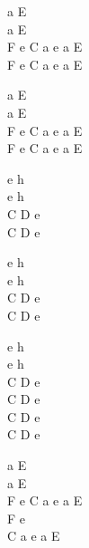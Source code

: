 \begin{chord}
    a E\\
    a E\\
    F e C a e a E\\
    F e C a e a E

    a E\\
    a E\\
    F e C a e a E\\
    F e C a e a E

    e h\\
    e h\\
    C D e\\
    C D e

    e h\\
    e h\\
    C D e\\
    C D e

    e h\\
    e h\\
    C D e\\
    C D e\\
    C D e\\
    C D e

    a E\\
    a E\\
    F e C a e a E\\
    F e\\
    C a e a E
\end{chord}